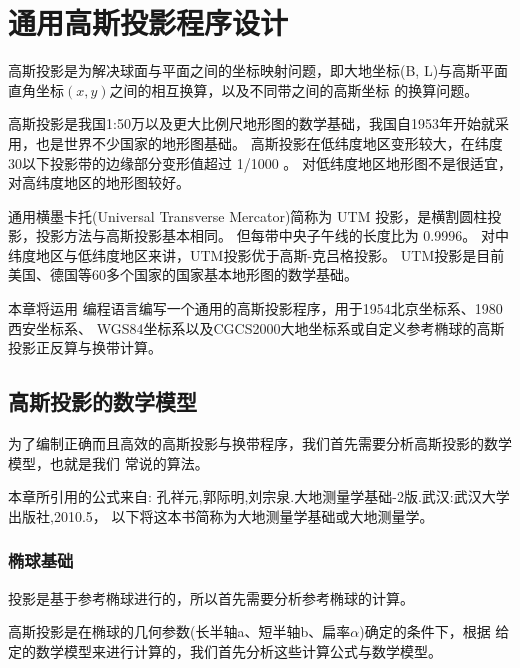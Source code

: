 
\chapter{通用高斯投影程序设计}

高斯投影是为解决球面与平面之间的坐标映射问题，即大地坐标(B,
L)与高斯平面直角坐标$(x,y)$之间的相互换算，以及不同带之间的高斯坐标
的换算问题。

高斯投影是我国1:50万以及更大比例尺地形图的数学基础，我国自1953年开始就采用，也是世界不少国家的地形图基础。
高斯投影在低纬度地区变形较大，在纬度30以下投影带的边缘部分变形值超过 1/1000 。
对低纬度地区地形图不是很适宜，对高纬度地区的地形图较好。

通用横墨卡托(Universal Transverse Mercator)简称为 UTM 投影，是横割圆柱投影，投影方法与高斯投影基本相同。
但每带中央子午线的长度比为 0.9996。
对中纬度地区与低纬度地区来讲，UTM投影优于高斯-克吕格投影。
UTM投影是目前美国、德国等60多个国家的国家基本地形图的数学基础。

本章将运用 \cs 编程语言编写一个通用的高斯投影程序，用于1954北京坐标系、1980西安坐标系、
WGS84坐标系以及CGCS2000大地坐标系或自定义参考椭球的高斯投影正反算与换带计算。


\section{高斯投影的数学模型}

为了编制正确而且高效的高斯投影与换带程序，我们首先需要分析高斯投影的数学模型，也就是我们
常说的算法。

本章所引用的公式来自:
孔祥元,郭际明,刘宗泉.大地测量学基础-2版.武汉:武汉大学出版社,2010.5，
以下将这本书简称为大地测量学基础或大地测量学。

\subsection{椭球基础}
投影是基于参考椭球进行的，所以首先需要分析参考椭球的计算。

高斯投影是在椭球的几何参数(长半轴a、短半轴b、扁率$\alpha$)确定的条件下，根据
给定的数学模型来进行计算的，我们首先分析这些计算公式与数学模型。


